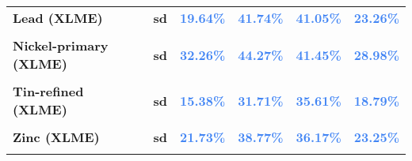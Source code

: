\documentclass[
  authoryear,
  preprint,
  3p]{elsarticle}
\begin{document}
\begin{longtable}[t]{>{}l>{}l>{}r>{}r>{}r>{}r}
\textbf{Lead (XLME)} & \textbf{sd} & \textcolor[HTML]{4285f4}{\textbf{19.64\%}} & \textcolor[HTML]{4285f4}{\textbf{41.74\%}} & \textcolor[HTML]{4285f4}{\textbf{41.05\%}} & \textcolor[HTML]{4285f4}{\textbf{23.26\%}}\\
\textbf{\cellcolor{gray!10}{Nickel-primary (XLME)}} & \textbf{\cellcolor{gray!10}{mean}} & \textcolor[HTML]{4285f4}{\textbf{\cellcolor{gray!10}{19.31\%}}} & \textcolor[HTML]{4285f4}{\textbf{\cellcolor{gray!10}{12.5\%}}} & \textcolor[HTML]{4285f4}{\textbf{\cellcolor{gray!10}{3.52\%}}} & \textcolor[HTML]{4285f4}{\textbf{\cellcolor{gray!10}{0.31\%}}}\\
\addlinespace
\textbf{Nickel-primary (XLME)} & \textbf{sd} & \textcolor[HTML]{4285f4}{\textbf{32.26\%}} & \textcolor[HTML]{4285f4}{\textbf{44.27\%}} & \textcolor[HTML]{4285f4}{\textbf{41.45\%}} & \textcolor[HTML]{4285f4}{\textbf{28.98\%}}\\
\textbf{\cellcolor{gray!10}{Tin-refined (XLME)}} & \textbf{\cellcolor{gray!10}{mean}} & \textcolor[HTML]{4285f4}{\textbf{\cellcolor{gray!10}{4.07\%}}} & \textcolor[HTML]{4285f4}{\textbf{\cellcolor{gray!10}{*29.1\%}}} & \textcolor[HTML]{4285f4}{\textbf{\cellcolor{gray!10}{7.46\%}}} & \textcolor[HTML]{4285f4}{\textbf{\cellcolor{gray!10}{1.68\%}}}\\
\textbf{Tin-refined (XLME)} & \textbf{sd} & \textcolor[HTML]{4285f4}{\textbf{15.38\%}} & \textcolor[HTML]{4285f4}{\textbf{31.71\%}} & \textcolor[HTML]{4285f4}{\textbf{35.61\%}} & \textcolor[HTML]{4285f4}{\textbf{18.79\%}}\\
\textbf{\cellcolor{gray!10}{Zinc (XLME)}} & \textbf{\cellcolor{gray!10}{mean}} & \textcolor[HTML]{4285f4}{\textbf{\cellcolor{gray!10}{-4.52\%}}} & \textcolor[HTML]{4285f4}{\textbf{\cellcolor{gray!10}{20.13\%}}} & \textcolor[HTML]{4285f4}{\textbf{\cellcolor{gray!10}{7.62\%}}} & \textcolor[HTML]{4285f4}{\textbf{\cellcolor{gray!10}{9.07\%}}}\\
\textbf{Zinc (XLME)} & \textbf{sd} & \textcolor[HTML]{4285f4}{\textbf{21.73\%}} & \textcolor[HTML]{4285f4}{\textbf{38.77\%}} & \textcolor[HTML]{4285f4}{\textbf{36.17\%}} & \textcolor[HTML]{4285f4}{\textbf{23.25\%}}\\
\addlinespace
\textbf{\cellcolor{gray!10}{US commodities}} & \textbf{\cellcolor{gray!10}{mean}} & \textcolor[HTML]{4285f4}{\textbf{\cellcolor{gray!10}{*6.89\%}}} & \textcolor[HTML]{4285f4}{\textbf{\cellcolor{gray!10}{**15.89\%}}} & \textcolor[HTML]{4285f4}{\textbf{\cellcolor{gray!10}{9.39\%}}} & \textcolor[HTML]{4285f4}{\textbf{\cellcolor{gray!10}{-0.18\%}}}\\

\end{longtable}
\end{document}
